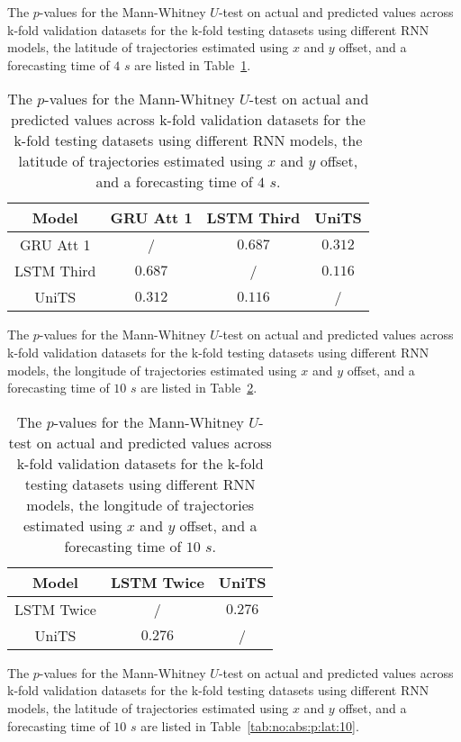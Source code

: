 The $p$-values for the Mann-Whitney $U$-test on actual and predicted values across k-fold validation datasets for the k-fold testing datasets using different RNN models, the latitude of trajectories estimated using $x$ and $y$ offset, and a forecasting time of $4$ $s$ are listed in Table~\ref{tab:no:abs:p:lat:4}.

\begin{table}[!ht]
	\centering
	\begin{tabular}{|c|c|c|c|}
		\hline
		Model & GRU Att 1 & LSTM Third & UniTS \\ \hline
		GRU Att 1 & / & $\mathbf{0.687}$ & $\mathbf{0.312}$ \\ \hline
		LSTM Third & $\mathbf{0.687}$ & / & $\mathbf{0.116}$ \\ \hline
		UniTS & $\mathbf{0.312}$ & $\mathbf{0.116}$ & / \\ \hline
	\end{tabular}
	\caption{The $p$-values for the Mann-Whitney $U$-test on actual and predicted values across k-fold validation datasets for the k-fold testing datasets using different RNN models, the latitude of trajectories estimated using $x$ and $y$ offset, and a forecasting time of $4$ $s$.}
	\label{tab:no:abs:p:lat:4}
\end{table}

The $p$-values for the Mann-Whitney $U$-test on actual and predicted values across k-fold validation datasets for the k-fold testing datasets using different RNN models, the longitude of trajectories estimated using $x$ and $y$ offset, and a forecasting time of $10$ $s$ are listed in Table~\ref{tab:no:abs:p:long:10}.

\begin{table}[!ht]
	\centering
	\begin{tabular}{|c|c|c|}
		\hline
		Model & LSTM Twice & UniTS \\ \hline
		LSTM Twice & / & $\mathbf{0.276}$ \\ \hline
		UniTS & $\mathbf{0.276}$ & / \\ \hline
	\end{tabular}
	\caption{The $p$-values for the Mann-Whitney $U$-test on actual and predicted values across k-fold validation datasets for the k-fold testing datasets using different RNN models, the longitude of trajectories estimated using $x$ and $y$ offset, and a forecasting time of $10$ $s$.}
	\label{tab:no:abs:p:long:10}
\end{table}

The $p$-values for the Mann-Whitney $U$-test on actual and predicted values across k-fold validation datasets for the k-fold testing datasets using different RNN models, the latitude of trajectories estimated using $x$ and $y$ offset, and a forecasting time of $10$ $s$ are listed in Table~\ref{tab:no:abs:p:lat:10}.

